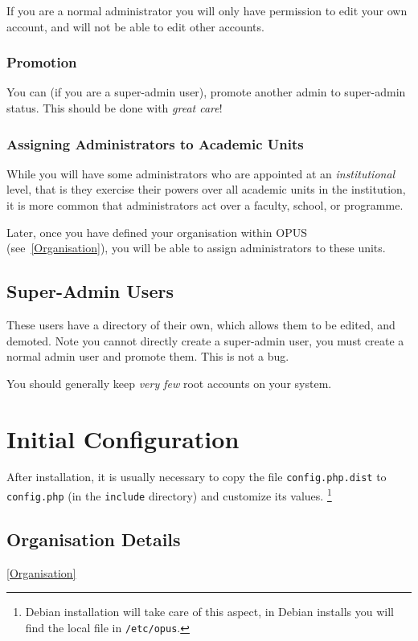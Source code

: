 \documentclass[12 pt]{book}
\begin{document}
If you are a normal administrator you will only have permission to edit your own
account, and will not be able to edit other accounts.


\subsection{Promotion}

You can (if you are a super-admin user), promote another admin to super-admin
status. This should be done with \emph{great care}!

\subsection{Assigning Administrators to Academic Units}

While you will have some administrators who are appointed at an \emph{institutional}
level, that is they exercise their powers over all academic units in the institution,
it is more common that administrators act over a faculty, school, or programme.

Later, once you have defined your organisation within OPUS (see~\ref{Organisation}),
you will be able to assign administrators to these units.

\section{Super-Admin Users}

These users have a directory of their own, which allows them to be edited,
and demoted. Note you cannot directly create a super-admin user, you must 
create a normal admin user and promote them. This is not a bug.

You should generally keep \emph{very few} root accounts on your system.

\chapter{Initial Configuration}

After installation, it is usually necessary to copy the file
\lstinline!config.php.dist! to \lstinline!config.php! (in the 
\lstinline!include! directory) and customize its values.
\footnote{Debian installation will take care of this aspect, in Debian installs
you will find the local file in \lstinline!/etc/opus!.}

\section{Organisation Details}
\ref{Organisation}
\end{document}
